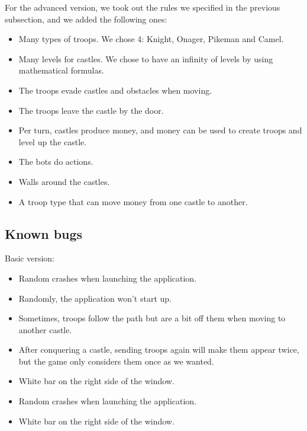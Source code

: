 \documentclass[12pt, a4paper]{report}
\begin{document}
For the advanced version, we took out the rules we specified in the previous subsection, and we added the following ones:

\begin{itemize}
    \item Many types of troops. We chose 4: Knight, Onager, Pikeman and Camel.
    \item Many levels for castles. We chose to have an infinity of levels by using mathematical formulas.
    \item The troops evade castles and obstacles when moving.
    \item The troops leave the castle by the door.
    \item Per turn, castles produce money, and money can be used to create troops and level up the castle.
    \item The bots do actions.
\end{itemize}


\begin{itemize}
    \item Walls around the castles.
    \item A troop type that can move money from one castle to another.
\end{itemize}

\subsection*{Known bugs}

Basic version:

\begin{itemize}
    \item Random crashes when launching the application.
    \item Randomly, the application won't start up.
    \item Sometimes, troops follow the path but are a bit off them when moving to another castle.
    \item After conquering a castle, sending troops again will make them appear twice, but the game only considers them once as we wanted.
    \item White bar on the right side of the window.
\end{itemize}


\begin{itemize}
    \item Random crashes when launching the application.
    \item White bar on the right side of the window.
\end{itemize}
\end{document}
